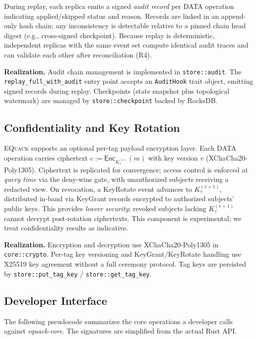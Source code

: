 \documentclass[10pt,journal,compsoc]{IEEEtran}
\newcommand{\equack}{\textsc{EQuack}}
\begin{document}
During replay, each replica emits a signed \emph{audit record} per DATA operation indicating applied/skipped status and reason. Records are linked in an append-only hash chain; any inconsistency is detectable relative to a pinned chain head digest (e.g., cross-signed checkpoint). Because replay is deterministic, independent replicas with the same event set compute identical audit traces and can validate each other after reconciliation (R4).

\textbf{Realization.} Audit chain management is implemented in \texttt{store::audit}. The \texttt{replay\_full\_with\_audit} entry point accepts an \texttt{AuditHook} trait object, emitting signed records during replay. Checkpoints (state snapshot plus topological watermark) are managed by \texttt{store::checkpoint} backed by RocksDB.

\subsection{Confidentiality and Key Rotation}

\equack{} supports an optional per-tag payload encryption layer. Each DATA operation carries ciphertext $c := \mathsf{Enc}_{K_{\tau}^{(v)}}(m)$ with key version $v$ (XChaCha20-Poly1305). Ciphertext is replicated for convergence; access control is enforced at \emph{query time} via the deny-wins gate, with unauthorized subjects receiving a redacted view. On revocation, a KeyRotate event advances to $K_{\tau}^{(v+1)}$, distributed in-band via KeyGrant records encrypted to authorized subjects' public keys. This provides \emph{leaver security}; revoked subjects lacking $K_{\tau}^{(v+1)}$ cannot decrypt post-rotation ciphertexts. This component is experimental; we treat confidentiality results as indicative.

\textbf{Realization.} Encryption and decryption use XChaCha20-Poly1305 in \texttt{core::crypto}. Per-tag key versioning and KeyGrant/KeyRotate handling use X25519 key agreement without a full ceremony protocol. Tag keys are persisted by \texttt{store::put\_tag\_key} / \texttt{store::get\_tag\_key}.

\subsection{Developer Interface}\label{subsec:developer-interface}

The following pseudocode summarizes the core operations a developer calls against \textit{equack-core}. The signatures are simplified from the actual Rust API.
\end{document}
